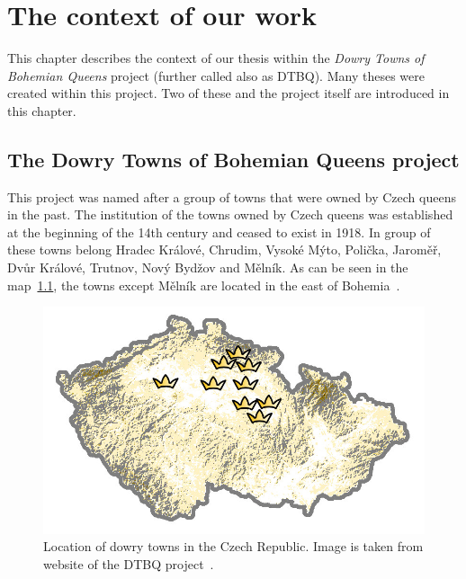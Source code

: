 \documentclass[thesis=B,english]{FITthesis}[2019/12/23]
\begin{document}
\chapter{The context of our work}
    This chapter describes the context of our thesis within the \textit{Dowry Towns of Bohemian Queens} project (further called also as DTBQ). Many theses were created within this project. Two of these and the project itself are introduced in this chapter.
    
    \section{The Dowry Towns of Bohemian Queens project}
        This project was named after a group of towns that were owned by Czech queens in the past. The institution of the towns owned by Czech queens was established at the beginning of the 14th century and ceased to exist in 1918. In group of these towns belong Hradec Králové, Chrudim, Vysoké Mýto, Polička, Jaroměř, Dvůr Králové, Trutnov, Nový Bydžov and Mělník. As can be seen in the map~\ref{img:vennaMestaMapa}, the towns except Mělník are located in the east of Bohemia~\cite{ghLr7y27wY4pk4xP}.
        
        \begin{figure}
            \centering
            \includegraphics[width = 0.6\linewidth]{pictures/kontextPrace/vennaMesta.jpg}
            \caption[Location of dowry towns in the Czech Republic]{Location of dowry towns in the Czech Republic. Image is taken from website of the DTBQ project~\cite{ghLr7y27wY4pk4xP}.}
            \label{img:vennaMestaMapa}
        \end{figure}
        
\end{document}
